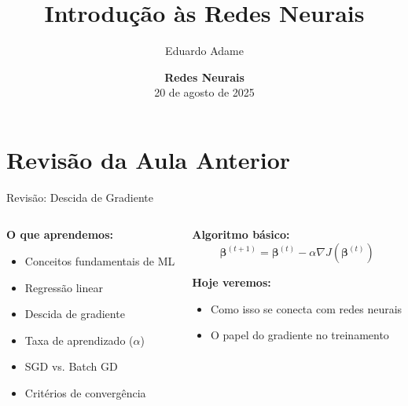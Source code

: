 \documentclass[xcolor=dvipsnames,t,aspectratio=169]{beamer}
\title{Introdução às Redes Neurais}
\author{
    Eduardo Adame
}
\date{{\color{nes_dark_purple}  \textbf{Redes Neurais}\\[0.5em] 20 de agosto de 2025 }}
\newcommand{\highlight}[1]{{\color{nes_dark_orange} #1}}
\begin{document}
\frame[plain]{\titlepage}
\setcounter{framenumber}{0}

\section{Revisão da Aula Anterior}
\begin{frame}[c]{Revisão: Descida de Gradiente}
    \begin{columns}[c]
        \begin{column}{0.5\textwidth}
            \textbf{O que aprendemos:}
            \begin{itemize}
                \item Conceitos fundamentais de ML
                \item Regressão linear
                \item \highlight{Descida de gradiente}
                \item Taxa de aprendizado ($\alpha$)
                \item SGD vs. Batch GD
                \item Critérios de convergência
            \end{itemize}
        \end{column}
        \begin{column}{0.5\textwidth}
            \textbf{Algoritmo básico:}
            \begin{equation}
                \boldsymbol{\beta}^{(t+1)} = \boldsymbol{\beta}^{(t)} - \alpha \nabla J(\boldsymbol{\beta}^{(t)})
            \end{equation}
            
            \vspace{0.5cm}
            \textbf{Hoje veremos:}
            \begin{itemize}
                \item Como isso se conecta com \highlight{redes neurais}
                \item O papel do gradiente no \highlight{treinamento}
            \end{itemize}
        \end{column}
    \end{columns}
\end{frame}
\end{document}
